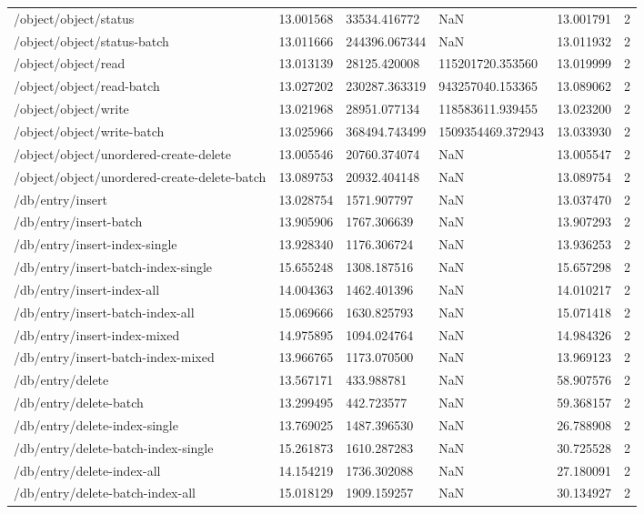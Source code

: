 \begin{tabularx}{\linewidth}{XXXXXX}
/object/object/status & 13.001568 & 33534.416772 & NaN & 13.001791 & 2 \\
/object/object/status-batch & 13.011666 & 244396.067344 & NaN & 13.011932 & 2 \\
/object/object/read & 13.013139 & 28125.420008 & 115201720.353560 & 13.019999 & 2 \\
/object/object/read-batch & 13.027202 & 230287.363319 & 943257040.153365 & 13.089062 & 2 \\
/object/object/write & 13.021968 & 28951.077134 & 118583611.939455 & 13.023200 & 2 \\
/object/object/write-batch & 13.025966 & 368494.743499 & 1509354469.372943 & 13.033930 & 2 \\
/object/object/unordered-create-delete & 13.005546 & 20760.374074 & NaN & 13.005547 & 2 \\
/object/object/unordered-create-delete-batch & 13.089753 & 20932.404148 & NaN & 13.089754 & 2 \\
/db/entry/insert & 13.028754 & 1571.907797 & NaN & 13.037470 & 2 \\
/db/entry/insert-batch & 13.905906 & 1767.306639 & NaN & 13.907293 & 2 \\
/db/entry/insert-index-single & 13.928340 & 1176.306724 & NaN & 13.936253 & 2 \\
/db/entry/insert-batch-index-single & 15.655248 & 1308.187516 & NaN & 15.657298 & 2 \\
/db/entry/insert-index-all & 14.004363 & 1462.401396 & NaN & 14.010217 & 2 \\
/db/entry/insert-batch-index-all & 15.069666 & 1630.825793 & NaN & 15.071418 & 2 \\
/db/entry/insert-index-mixed & 14.975895 & 1094.024764 & NaN & 14.984326 & 2 \\
/db/entry/insert-batch-index-mixed & 13.966765 & 1173.070500 & NaN & 13.969123 & 2 \\
/db/entry/delete & 13.567171 & 433.988781 & NaN & 58.907576 & 2 \\
/db/entry/delete-batch & 13.299495 & 442.723577 & NaN & 59.368157 & 2 \\
/db/entry/delete-index-single & 13.769025 & 1487.396530 & NaN & 26.788908 & 2 \\
/db/entry/delete-batch-index-single & 15.261873 & 1610.287283 & NaN & 30.725528 & 2 \\
/db/entry/delete-index-all & 14.154219 & 1736.302088 & NaN & 27.180091 & 2 \\
/db/entry/delete-batch-index-all & 15.018129 & 1909.159257 & NaN & 30.134927 & 2 \\

\end{tabularx}
